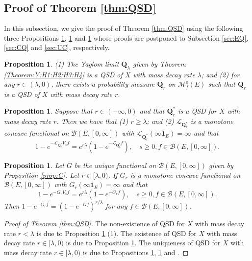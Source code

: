 \documentclass[12pt,a4paper]{amsart}
\numberwithin{equation}{section}
\theoremstyle{plain}
\newtheorem{prop}[thm]{Proposition}
\theoremstyle{definition}
\theoremstyle{remark}
\begin{document}
\subsection{Proof of Theorem \ref{thm:QSD}}
	In this subsection,
	we give the proof of Theorem \ref{thm:QSD} using the following three
Propositions \ref{prop:EQ}, \ref{prop:CQ} and \ref{prop:UC}  whose proofs are postponed to
Subsection \ref{sec:EQ}, \ref{sec:CQ} and \ref{sec:UC}, respectively.

\begin{prop} \label{prop:EQ}
	(1) The Yaglom limit $\mathbf Q_\lambda$ given by Theorem \ref{Theorem:Y:H1:H2:H3:H4} is a QSD of $X$ with mass decay rate $\lambda$; and
	(2) for any $r \in (\lambda , 0)$, 
	there exists a probability measure $\mathbf Q_r$  on $\mathcal M^o_f(E)$
such that  $\mathbf Q_r$ is a QSD of $X$ with mass decay rate $r$.
\end{prop}


\begin{prop} \label{prop:CQ}
	Suppose that $r \in (-\infty, 0)$ and that  $\mathbf Q^*_{r}$
	is a QSD
	for $X$ with mass decay rate $r$.
	Then we have that (1) $r \geq \lambda$; and
	(2) $\mathscr L_{\mathbf Q^*_r}$ is a monotone concave functional on $\mathcal B(E,[0,\infty])$ 
	with $\mathscr L_{\mathbf Q^*_r}(\infty \mathbf 1_E) = \infty$ and that
\[
	1 - e^{- \mathscr L_{\mathbf Q^*_r} V_s f} = e^{r\lambda }(1- e^{- \mathscr L_{\mathbf Q^*_r} f}), \quad s\geq 0, f\in \mathcal B(E,[0,\infty]).
\]
\end{prop}

\begin{prop} \label{prop:UC}
	Let $G$ be the unique functional on $\mathcal B(E,[0,\infty])$ given by Proposition \ref{prop:G}.
	Let $r \in [\lambda, 0)$.
	If $G_r$ is a monotone concave functional on $\mathcal B(E,[0,\infty])$ with 
	$G_r(\infty \mathbf 1_E) = \infty$ and that
\[
	1 - e^{-G_r V_s f} = e^{r\lambda }(1- e^{- G_r f}), \quad s\geq 0, f\in \mathcal B(E,[0,\infty]).
\]
	Then $1 - e^{-G_rf} = (1 - e^{- G f})^{r/\lambda}$ for any $f\in \mathcal B(E,[0,\infty])$.
\end{prop}

\begin{proof}[Proof of Theorem \ref{thm:QSD}]
	The non-existence of QSD for $X$ with mass decay rate $r < \lambda$ is due to Proposition \ref{prop:CQ} (1).
	The existence of QSD for $X$ with mass decay rate $r \in [\lambda,0)$ is due to Proposition \ref{prop:EQ}.
	The uniqueness of QSD for $X$ with mass decay rate $r\in [\lambda , 0)$ is due to Propositions \ref{prop:CQ}, \ref{prop:UC} and \cite[Theorem 1.17]{Li2011MeasureValued}.
\end{proof}
\end{document}
